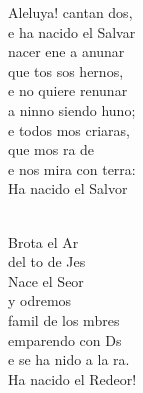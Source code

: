 \documentclass[12pt]{article}
\begin{document}
\begin{multicols*}{2}
\begin{cancion}
	Aleluya! cantan dos,\\
	e ha nacido el Salvar  \\
	 nacer ene a anunar\\
	que tos sos hernos,\\
	e no quiere renunar\\
	a ninno siendo huno; \\
	e todos mos criaras, \\
	que mos ra de   \\
	e nos mira con terra:\\
	Ha nacido el Salvor  \\\jump\\
	\begin{chorus}%
	Brota el Ar \\
	del to de Jes\\
	Nace el Seor \\
	y odremos \\
	 famil de los mbres  \\
	 emparendo con Ds  \\
	e se ha nido a la ra.\\
	Ha nacido el Redeor!\\
	\end{chorus}%
	\jump\\
	      \\
\end{cancion}%


\end{multicols*}
\end{document}
